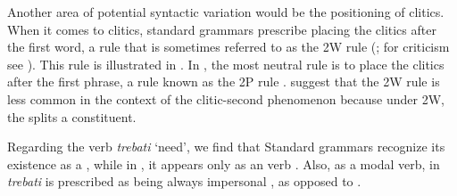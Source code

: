 \documentclass[output=paper,modfonts,newtxmath,hidelinks,]{langscibook}
\begin{document}
\ea \label{7:ex1}
	\z
\z

\noindent Another area of potential syntactic variation would be the positioning of clitics. When it comes to clitics, standard  grammars prescribe placing the clitics after the first word, a rule that is sometimes referred to as the 2W rule (\citealt{Katicic}; for criticism see \citealt{Peti-Stantic2009}). This rule is illustrated in . In , the most neutral rule is to place the clitics after the first phrase, a rule known as the 2P rule . \citet{CorbettBrowne2009} suggest that the 2W rule is less common in the context of the clitic-second phenomenon because under 2W, the  splits a constituent. 

\ea \label{7:ex2}
	\z
\z

\noindent Regarding the verb \textit{trebati} `need’, we find that Standard  grammars recognize its existence as a  , while in , it appears only as an  verb . Also, as a modal verb, in  \textit{trebati} is prescribed as being always impersonal , as opposed to  .

\ea \label{7:ex3}
	\z
\z
\end{document}
